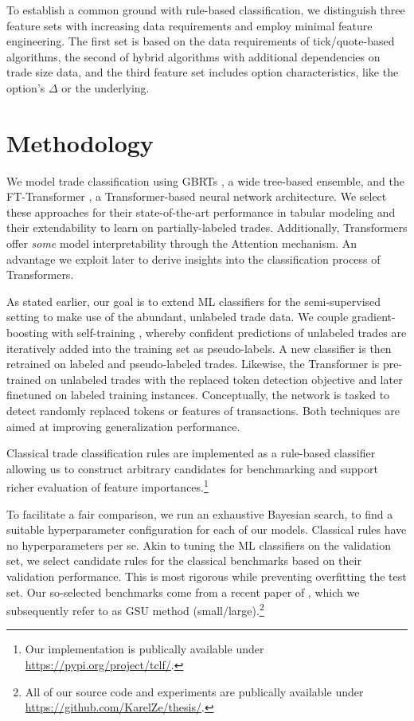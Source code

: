 To establish a common ground with rule-based classification, we distinguish three feature sets with increasing data requirements and employ minimal feature engineering. The first set is based on the data requirements of tick/quote-based algorithms, the second of hybrid algorithms with additional dependencies on trade size data, and the third feature set includes option characteristics, like the option's $\Delta$ or the underlying. 

\section{Methodology}

We model trade classification using \glspl{GBRT} \autocites[][]{friedmanGreedyFunctionApproximation2001}, a wide tree-based ensemble, and the FT-Transformer \autocite{gorishniyRevisitingDeepLearning2021}, a Transformer-based neural network architecture. We select these approaches for their state-of-the-art performance in tabular modeling \autocites[][]{gorishniyRevisitingDeepLearning2021}[][]{grinsztajnWhyTreebasedModels2022} and their extendability to learn on partially-labeled trades. Additionally, Transformers offer \textit{some} model interpretability through the Attention mechanism. An advantage we exploit later to derive insights into the classification process of Transformers.

As stated earlier, our goal is to extend \gls{ML} classifiers for the semi-supervised setting to make use of the abundant, unlabeled trade data. We couple gradient-boosting with self-training \autocite{yarowskyUnsupervisedWordSense1995}, whereby confident predictions of unlabeled trades are iteratively added into the training set as pseudo-labels. A new classifier is then retrained on labeled and pseudo-labeled trades. Likewise, the Transformer is pre-trained on unlabeled trades with the replaced token detection objective \autocite{clarkElectraPretrainingText2020} and later finetuned on labeled training instances. Conceptually, the network is tasked to detect randomly replaced tokens or features of transactions. Both techniques are aimed at improving generalization performance.

Classical trade classification rules are implemented as a rule-based classifier allowing us to construct arbitrary candidates for benchmarking and support richer evaluation of feature importances.\footnote{Our implementation is publically available under \url{https://pypi.org/project/tclf/}.}

To facilitate a fair comparison, we run an exhaustive Bayesian search, to find a suitable hyperparameter configuration for each of our models. Classical rules have no hyperparameters per se. Akin to tuning the \gls{ML} classifiers on the validation set, we select candidate rules for the classical benchmarks based on their validation performance. This is most rigorous while preventing overfitting the test set. Our so-selected benchmarks come from a recent paper of \textcite{grauerOptionTradeClassification2022}, which we subsequently refer to as \gls{GSU} method (small/large).\footnote{All of our source code and experiments are publically available under \url{https://github.com/KarelZe/thesis/}.}

